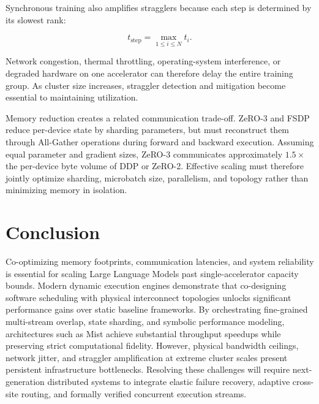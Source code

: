 \documentclass[11pt,journal,final, onecolumn]{IEEEtran}
\begin{document}
Synchronous training also amplifies stragglers because each step is determined
by its slowest rank:

\[
    t_{\mathrm{step}}
    = \max_{1 \leq i \leq N} t_i.
\]

Network congestion, thermal throttling, operating-system interference, or
degraded hardware on one accelerator can therefore delay the entire training
group. As cluster size increases, straggler detection and mitigation become
essential to maintaining utilization.

Memory reduction creates a related communication trade-off. ZeRO-3 and FSDP
reduce per-device state by sharding parameters, but must reconstruct them
through All-Gather operations during forward and backward execution. Assuming
equal parameter and gradient sizes, ZeRO-3 communicates approximately
\(1.5\times\) the per-device byte volume of DDP or ZeRO-2. Effective scaling
must therefore jointly optimize sharding, microbatch size, parallelism, and
topology rather than minimizing memory in isolation.


\section{Conclusion}
Co-optimizing memory footprints, communication latencies, and system reliability is essential for scaling Large Language Models past single-accelerator capacity bounds. Modern dynamic execution engines demonstrate that co-designing software scheduling with physical interconnect topologies unlocks significant performance gains over static baseline frameworks. By orchestrating fine-grained multi-stream overlap, state sharding, and symbolic performance modeling, architectures such as Mist achieve substantial throughput speedups while preserving strict computational fidelity. However, physical bandwidth ceilings, network jitter, and straggler amplification at extreme cluster scales present persistent infrastructure bottlenecks. Resolving these challenges will require next-generation distributed systems to integrate elastic failure recovery, adaptive cross-site routing, and formally verified concurrent execution streams.




\end{document}
